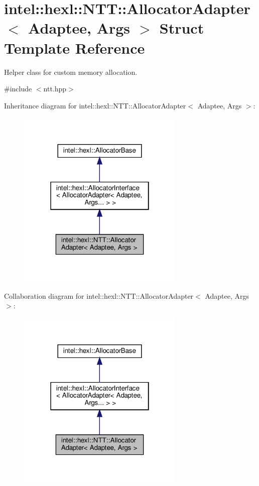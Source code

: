 \hypertarget{structintel_1_1hexl_1_1NTT_1_1AllocatorAdapter}{}\section{intel\+:\+:hexl\+:\+:N\+TT\+:\+:Allocator\+Adapter$<$ Adaptee, Args $>$ Struct Template Reference}
\label{structintel_1_1hexl_1_1NTT_1_1AllocatorAdapter}


Helper class for custom memory allocation.  




{\ttfamily \#include $<$ntt.\+hpp$>$}



Inheritance diagram for intel\+:\+:hexl\+:\+:N\+TT\+:\+:Allocator\+Adapter$<$ Adaptee, Args $>$\+:
\nopagebreak
\begin{figure}[H]
\begin{center}
\leavevmode
\includegraphics[width=226pt]{structintel_1_1hexl_1_1NTT_1_1AllocatorAdapter__inherit__graph}
\end{center}
\end{figure}


Collaboration diagram for intel\+:\+:hexl\+:\+:N\+TT\+:\+:Allocator\+Adapter$<$ Adaptee, Args $>$\+:
\nopagebreak
\begin{figure}[H]
\begin{center}
\leavevmode
\includegraphics[width=226pt]{structintel_1_1hexl_1_1NTT_1_1AllocatorAdapter__coll__graph}
\end{center}
\end{figure}
